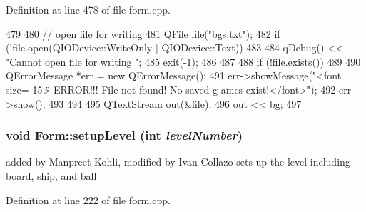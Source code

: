 Definition at line 478 of file form.cpp.


\begin{DoxyCode}
479 {
480     // open file for writing
481     QFile file("bgs.txt");
482     if (!file.open(QIODevice::WriteOnly | QIODevice::Text))
483     {
484         qDebug() << "Cannot open file for writing ";
485         exit(-1);
486     }
487 
488     if (!file.exists())
489     {
490         QErrorMessage *err = new QErrorMessage();
491         err->showMessage("<font size= \"15\"> ERROR!!! File not found! No saved g
      ames exist!</font>");
492         err->show();
493     }
494 
495     QTextStream out(&file);
496     out << bg;
497 }
\end{DoxyCode}
\hypertarget{class_form_add0aafd8f5b0dd308b526cefb5d13367}{
\subsubsection[{setupLevel}]{\setlength{\rightskip}{0pt plus 5cm}void Form::setupLevel (int {\em levelNumber})}}
\label{class_form_add0aafd8f5b0dd308b526cefb5d13367}
added by Manpreet Kohli, modified by Ivan Collazo sets up the level including board, ship, and ball 

Definition at line 222 of file form.cpp.


